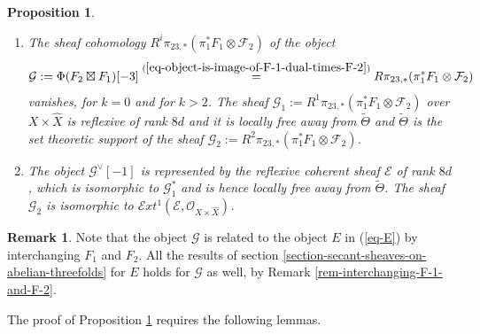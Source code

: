 \documentclass[12pt]{amsart}
\numberwithin{equation}{subsection}
\theoremstyle{plain}
\newtheorem{prop}[thm]{Proposition}
\theoremstyle{definition}
\newtheorem{rem}[thm]{Remark}
\newcommand{\E}{{\mathcal E}}
\newcommand{\F}{{\mathcal F}}
\newcommand{\G}{{\mathcal G}}
\newcommand{\StructureSheaf}[1]{{\mathcal O}_{#1}}
\newcommand{\SheafExt}{{\mathcal E}xt}
\begin{document}
\begin{prop}
\label{prop-local-freeness}
\begin{enumerate}
\item
\label{prop-local-freeness-E}
The sheaf cohomology $R^i\pi_{23,*}(\pi_1^*F_1\otimes \F_2)$ of the object 
\[
\G:=\Phi(F_2\boxtimes F_1)[-3]\stackrel{(\ref{eq-object-is-image-of-F-1-dual-times-F-2})}{=}R\pi_{23,*}(\pi_1^*F_1\otimes \F_2)
\]
vanishes, for $k=0$ and for $k> 2$. The sheaf $\G_1:=R^1\pi_{23,*}(\pi_1^*F_1\otimes \F_2)$ over $X\times\hat{X}$ is reflexive of rank $8d$ and it is locally free away from $\tilde{\Theta}$ and $\tilde{\Theta}$ 
is the set theoretic support of 
the sheaf $\G_2:=R^2\pi_{23,*}(\pi_1^*F_1\otimes \F_2)$.
\item
\label{prop-local-freeness-G}
The object $\G^\vee[-1]$ 
is represented by the reflexive coherent sheaf $\E$ of rank $8d$, which is isomorphic to $\G_1^*$ and is hence locally free away from $\tilde{\Theta}$. The sheaf $\G_2$ is isomorphic to $\SheafExt^1(\E,\StructureSheaf{X\times\hat{X}})$.
\end{enumerate}
\end{prop}

\begin{rem}
\label{remark-all-the-results-for-E-hold-for-G}
Note that the object $\G$ is related to the object $E$ in (\ref{eq-E}) by interchanging $F_1$ and $F_2$. All the results of section \ref{section-secant-sheaves-on-abelian-threefolds} for $E$ holds for $\G$ as well, by Remark \ref{rem-interchanging-F-1-and-F-2}.
\end{rem}

The proof of Proposition \ref{prop-local-freeness} requires  the following lemmas.
\end{document}
